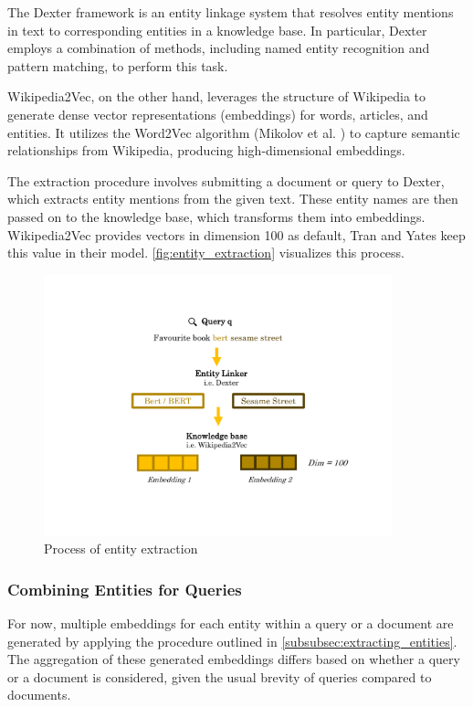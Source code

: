 The Dexter framework is an entity linkage system that resolves entity mentions in text to corresponding entities in a knowledge base. In particular, Dexter employs a combination of methods, including named entity recognition and pattern matching, to perform this task. 

Wikipedia2Vec, on the other hand, leverages the structure of Wikipedia to generate dense vector representations (embeddings) for words, articles, and entities. It utilizes the Word2Vec algorithm (Mikolov et al. \cite{mikolov2013distributed}) to capture semantic relationships from Wikipedia, producing high-dimensional embeddings.

The extraction procedure involves submitting a document or query to Dexter, which extracts entity mentions from the given text. These entity names are then passed on to the knowledge base, which transforms them into embeddings. Wikipedia2Vec provides vectors in dimension 100 as default, Tran and Yates keep this value in their model. \autoref{fig:entity_extraction} visualizes this process.

\begin{figure}[!htb]
    \centering
    \includegraphics[trim={2cm 3cm 2cm 2cm}, clip, width=0.9\textwidth]{resources/entity_extraction} 
    \caption{Process of entity extraction}
    \label{fig:entity_extraction}
\end{figure}

\subsubsection{Combining Entities for Queries}\label{subsub:generating_queries}

For now, multiple embeddings for each entity within a query or a document are generated by applying the procedure outlined in \autoref{subsubsec:extracting_entities}. The aggregation of these generated embeddings differs based on whether a query or a document is considered, given the usual brevity of queries compared to documents.


